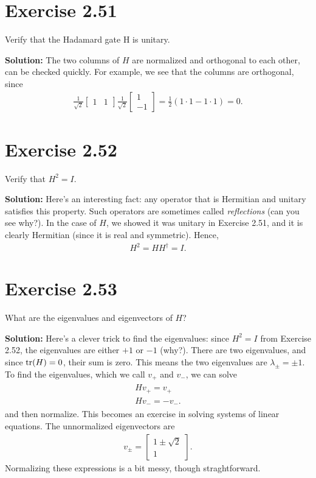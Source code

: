 \documentclass{book}
\begin{document}
\section*{Exercise 2.51}
    Verify that the Hadamard gate H is unitary.
    
    \textbf{Solution:} The two columns of $H$ are normalized and orthogonal to each other, can be checked quickly. For example, we see that the columns are orthogonal, since
    \begin{align}
        \frac{1}{\sqrt{2}}\begin{bmatrix}
            1 & 1
        \end{bmatrix} \frac{1}{\sqrt{2}} \begin{bmatrix}
            1 \\
            -1
        \end{bmatrix} = \frac{1}{2}(1\cdot 1 - 1\cdot 1) = 0.
    \end{align}
    
\section*{Exercise 2.52}
    Verify that $H^2 = I$.
    
    \textbf{Solution:} Here's an interesting fact: any operator that is Hermitian and unitary satisfies this property. Such operators are sometimes called \emph{reflections} (can you see why?). In the case of $H$, we showed it was unitary in Exercise 2.51, and it is clearly Hermitian (since it is real and symmetric). Hence,
    \begin{align}
        H^2 = H H^\dagger = I.
    \end{align}
    
\section*{Exercise 2.53}
    What are the eigenvalues and eigenvectors of $H$?
    
    \textbf{Solution:} Here's a clever trick to find the eigenvalues: since $H^2 = I$ from Exercise 2.52, the eigenvalues are either $+1$ or $-1$ (why?). There are two eigenvalues, and since $\tr(H) = 0$, their sum is zero. This means the two eigenvalues are $\lambda_{\pm} = \pm 1$. To find the eigenvalues, which we call $v_+$ and $v_-$, we can solve 
    \begin{align}
    \begin{aligned}
        H v_+ = v_+ \\
        H v_- = -v_-.
    \end{aligned}
    \end{align}
    and then normalize. This becomes an exercise in solving systems of linear equations. The unnormalized eigenvectors are 
    \begin{align}
        v_{\pm} = \begin{bmatrix}
            1 \pm \sqrt{2} \\
            1
        \end{bmatrix}.
    \end{align}
    Normalizing these expressions is a bit messy, though straghtforward.
    
\end{document}

